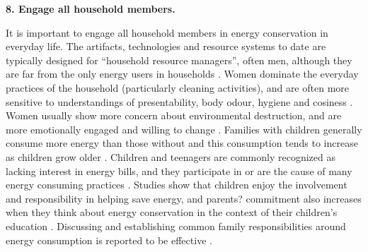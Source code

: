 \vspace{.3cm}
\noindent\textbf{8. Engage all household members.}

It is important to engage all household members in energy conservation in everyday life. The artifacts, technologies and resource systems to date are typically designed for ``household resource managers'', often men, although they are far from the only energy users in households \citep{Strengers2014}. Women dominate the everyday practices of the household (particularly cleaning activities), and are often more sensitive to understandings of presentability, body odour, hygiene and cosiness \citep{Strengers2014}. Women usually show more concern about environmental destruction, and are more emotionally engaged and willing to change \citep{Kollmuss2002}. Families with children generally consume more energy than those without and this consumption tends to increase as children grow older  \citep{Fell2014}. Children and teenagers are commonly recognized as lacking interest in energy bills, and they participate in or are the cause of many energy consuming practices \citep{Berthou2013,Strengers2014}. Studies show that children enjoy the involvement and responsibility in helping save energy, and parents? commitment also increases when they think about energy conservation in the context of their children's education  \citep{Burchell2014,Fell2014}. Discussing and establishing common family responsibilities around energy consumption is reported to be effective  \citep{huizenga2015shedding}. 

